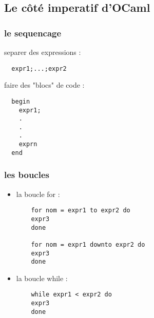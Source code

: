 \subsection{Le côté imperatif d'OCaml} %

\begin{frame}[fragile]
  \frametitle{le sequencage}
  separer des expressions :
  \begin{lstlisting}
  expr1;...;expr2
  \end{lstlisting}
  faire des "blocs" de code :
  \begin{lstlisting}
  begin
    expr1; 
    .
    .
    .
    exprn
  end
  \end{lstlisting}
\end{frame}

\begin{frame}[fragile]
    \frametitle{les boucles}
    \begin{itemize}
      \item
	la boucle for :
	\begin{lstlisting}
	for nom = expr1 to expr2 do 
	expr3
	done

	for nom = expr1 downto expr2 do
	expr3
	done
	\end{lstlisting}
      \item
	la boucle while :
	\begin{lstlisting}
	while expr1 < expr2 do
	expr3
	done
      \end{lstlisting}
  \end{itemize}
\end{frame}
